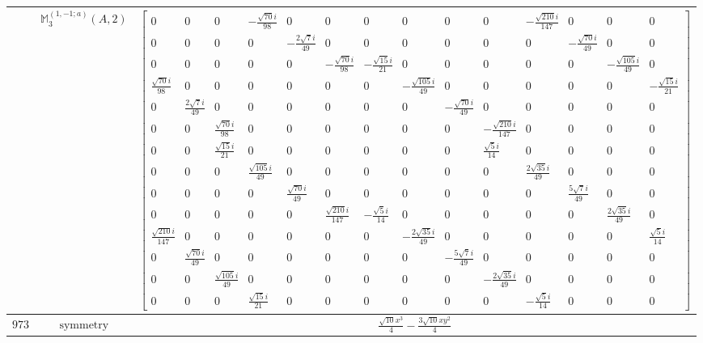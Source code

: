 \documentclass[fleqn,8pt,landscape]{jsarticle}
\begin{document}
\begin{longtable}{ccc}
$  $ & $ \mathbb{M}_{3}^{(1,-1;a)}(A,2) $ & $ \begin{bmatrix} 0 & 0 & 0 & - \frac{\sqrt{70} i}{98} & 0 & 0 & 0 & 0 & 0 & 0 & - \frac{\sqrt{210} i}{147} & 0 & 0 & 0 \\ 0 & 0 & 0 & 0 & - \frac{2 \sqrt{7} i}{49} & 0 & 0 & 0 & 0 & 0 & 0 & - \frac{\sqrt{70} i}{49} & 0 & 0 \\ 0 & 0 & 0 & 0 & 0 & - \frac{\sqrt{70} i}{98} & - \frac{\sqrt{15} i}{21} & 0 & 0 & 0 & 0 & 0 & - \frac{\sqrt{105} i}{49} & 0 \\ \frac{\sqrt{70} i}{98} & 0 & 0 & 0 & 0 & 0 & 0 & - \frac{\sqrt{105} i}{49} & 0 & 0 & 0 & 0 & 0 & - \frac{\sqrt{15} i}{21} \\ 0 & \frac{2 \sqrt{7} i}{49} & 0 & 0 & 0 & 0 & 0 & 0 & - \frac{\sqrt{70} i}{49} & 0 & 0 & 0 & 0 & 0 \\ 0 & 0 & \frac{\sqrt{70} i}{98} & 0 & 0 & 0 & 0 & 0 & 0 & - \frac{\sqrt{210} i}{147} & 0 & 0 & 0 & 0 \\ 0 & 0 & \frac{\sqrt{15} i}{21} & 0 & 0 & 0 & 0 & 0 & 0 & \frac{\sqrt{5} i}{14} & 0 & 0 & 0 & 0 \\ 0 & 0 & 0 & \frac{\sqrt{105} i}{49} & 0 & 0 & 0 & 0 & 0 & 0 & \frac{2 \sqrt{35} i}{49} & 0 & 0 & 0 \\ 0 & 0 & 0 & 0 & \frac{\sqrt{70} i}{49} & 0 & 0 & 0 & 0 & 0 & 0 & \frac{5 \sqrt{7} i}{49} & 0 & 0 \\ 0 & 0 & 0 & 0 & 0 & \frac{\sqrt{210} i}{147} & - \frac{\sqrt{5} i}{14} & 0 & 0 & 0 & 0 & 0 & \frac{2 \sqrt{35} i}{49} & 0 \\ \frac{\sqrt{210} i}{147} & 0 & 0 & 0 & 0 & 0 & 0 & - \frac{2 \sqrt{35} i}{49} & 0 & 0 & 0 & 0 & 0 & \frac{\sqrt{5} i}{14} \\ 0 & \frac{\sqrt{70} i}{49} & 0 & 0 & 0 & 0 & 0 & 0 & - \frac{5 \sqrt{7} i}{49} & 0 & 0 & 0 & 0 & 0 \\ 0 & 0 & \frac{\sqrt{105} i}{49} & 0 & 0 & 0 & 0 & 0 & 0 & - \frac{2 \sqrt{35} i}{49} & 0 & 0 & 0 & 0 \\ 0 & 0 & 0 & \frac{\sqrt{15} i}{21} & 0 & 0 & 0 & 0 & 0 & 0 & - \frac{\sqrt{5} i}{14} & 0 & 0 & 0 \end{bmatrix} $ \\ \hline
$ 973 $ & $ \text{symmetry} $ & $ \frac{\sqrt{10} x^{3}}{4} - \frac{3 \sqrt{10} x y^{2}}{4} $ \\

\end{longtable}
\end{document}
